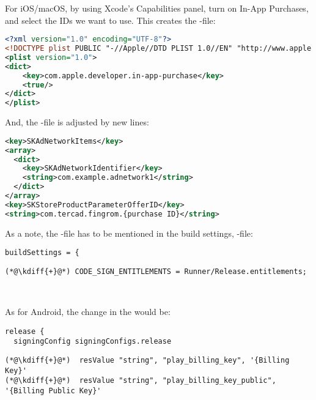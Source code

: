 \noindent For iOS/macOS, by using Xcode's Capabilities panel, turn on In-App Purchases, and select the IDs we want to 
use. This creates the -file:
\newpage
\begin{lstlisting}[language=xml]
<?xml version="1.0" encoding="UTF-8"?>
<!DOCTYPE plist PUBLIC "-//Apple//DTD PLIST 1.0//EN" "http://www.apple.com/DTDs/PropertyList-1.0.dtd">
<plist version="1.0">
<dict>
    <key>com.apple.developer.in-app-purchase</key>
    <true/>
</dict>
</plist>  
\end{lstlisting}

\noindent And, the -file is adjusted by new lines:

\begin{lstlisting}[language=xml]
<key>SKAdNetworkItems</key>
<array>
  <dict>
    <key>SKAdNetworkIdentifier</key>
    <string>com.example.adnetwork1</string>
  </dict>
</array>
<key>SKStoreProductParameterOfferID</key>
<string>com.tercad.fingrom.{purchase ID}</string>
\end{lstlisting}

\noindent As a note, the -file has to be mentioned in the build settings, 
-file:

\begin{lstlisting}
buildSettings = {
\end{lstlisting}
{
\xpretocmd{\lstlisting}{\vspace{-12pt}}{}{}
\begin{lstlisting}[firstnumber=20, backgroundcolor=\color{backgreen}]
(*@\kdiff{+}@*)	CODE_SIGN_ENTITLEMENTS = Runner/Release.entitlements;
\end{lstlisting}
}

~

\noindent As for Android, the change in the  would be:

\begin{lstlisting}
release {
  signingConfig signingConfigs.release
\end{lstlisting}
{
\xpretocmd{\lstlisting}{\vspace{-12pt}}{}{}
\begin{lstlisting}[firstnumber=2, backgroundcolor=\color{backgreen}]
(*@\kdiff{+}@*)  resValue "string", "play_billing_key", '{Billing Key}'
(*@\kdiff{+}@*)  resValue "string", "play_billing_key_public", '{Billing Public Key}'
\end{lstlisting}
}
